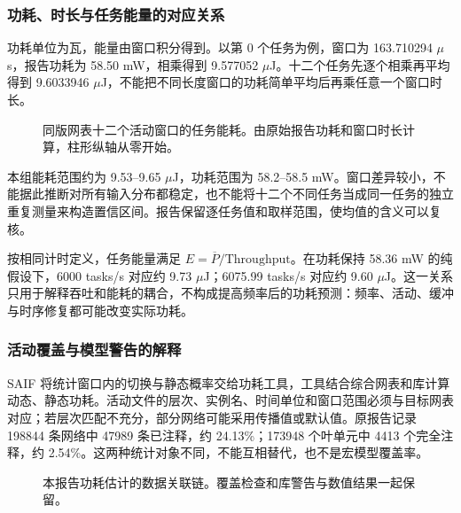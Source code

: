 \subsubsection{功耗、时长与任务能量的对应关系}
功耗单位为瓦，能量由窗口积分得到。以第 0 个任务为例，窗口为 163.710294 $\mu$s，报告功耗为 58.50 mW，相乘得到 9.577052 $\mu$J。十二个任务先逐个相乘再平均得到 9.6033946 $\mu$J，不能把不同长度窗口的功耗简单平均后再乘任意一个窗口时长。

\begin{figure}[H]\centering
{}
\caption{同版网表十二个活动窗口的任务能耗。由原始报告功耗和窗口时长计算，柱形纵轴从零开始。}
\end{figure}

本组能耗范围约为 9.53--9.65 $\mu$J，功耗范围为 58.2--58.5 mW。窗口差异较小，不能据此推断对所有输入分布都稳定，也不能将十二个不同任务当成同一任务的独立重复测量来构造置信区间。报告保留逐任务值和取样范围，使均值的含义可以复核。

按相同计时定义，任务能量满足 $E=\overline P/\mathrm{Throughput}$。在功耗保持 58.36 mW 的纯假设下，6000 tasks/s 对应约 9.73 $\mu$J；6075.99 tasks/s 对应约 9.60 $\mu$J。这一关系只用于解释吞吐和能耗的耦合，不构成提高频率后的功耗预测：频率、活动、缓冲与时序修复都可能改变实际功耗。

\subsubsection{活动覆盖与模型警告的解释}
SAIF 将统计窗口内的切换与静态概率交给功耗工具，工具结合综合网表和库计算动态、静态功耗。活动文件的层次、实例名、时间单位和窗口范围必须与目标网表对应；若层次匹配不充分，部分网络可能采用传播值或默认值。原报告记录 198844 条网络中 47989 条已注释，约 24.13\%；173948 个叶单元中 4413 个完全注释，约 2.54\%。这两种统计对象不同，不能互相替代，也不是宏模型覆盖率。

\begin{figure}[H]\centering
{}
\caption{本报告功耗估计的数据关联链。覆盖检查和库警告与数值结果一起保留。}
\end{figure}

